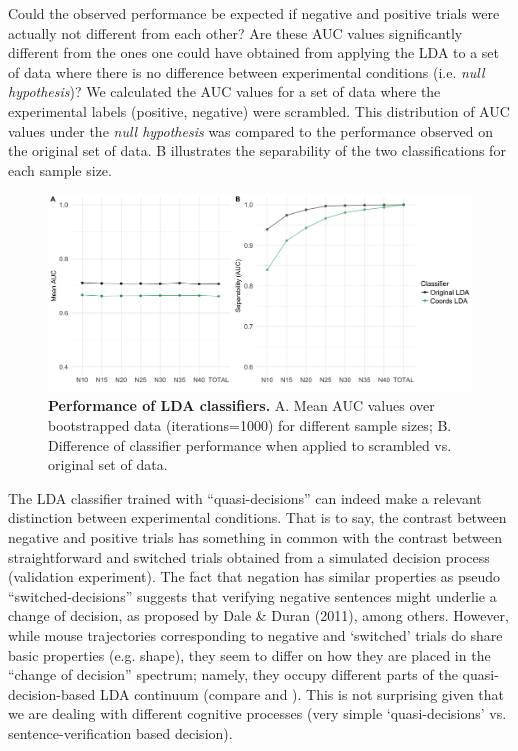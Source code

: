 \documentclass{article}
\begin{document}
Could the observed performance be expected if negative and positive trials were actually not different from each other? Are these AUC values significantly different from the ones one could have obtained from applying the LDA to a set of data where there is no difference between experimental conditions (i.e. \emph{null hypothesis})? We calculated the AUC values for a set of data where the experimental labels (positive, negative) were scrambled. This distribution of AUC values under the \emph{null hypothesis} was compared to the performance observed on the original set of data. B illustrates the separability of the two classifications for each sample size.

\begin{figure}
\centering
\includegraphics[width=\textwidth]{auc_permutation_negation_1.png}
\caption{\textbf{Performance of LDA classifiers.} A. Mean AUC values over bootstrapped data (iterations=1000) for different sample sizes;  B. Difference of classifier performance when applied to scrambled vs. original set of data.}
\label{fig:permutation_AUC_negation}
\end{figure}


The LDA classifier trained with ``quasi-decisions'' can indeed make a relevant distinction between experimental conditions. That is to say, the contrast between negative and positive trials has something in common with the contrast between straightforward and switched trials obtained from  a simulated decision process (validation experiment). The fact that negation has similar properties as pseudo “switched-decisions'' suggests that verifying negative sentences might underlie a change of decision, as proposed by Dale \& Duran (2011), among others.  
However, while mouse trajectories corresponding to negative and `switched' trials do share basic properties (e.g. shape), they seem to differ on how they are placed in the “change of decision” spectrum; namely, they occupy different parts of the quasi-decision-based LDA continuum (compare  and ). This is not surprising given that we are dealing with different cognitive processes (very simple `quasi-decisions' vs. sentence-verification based decision). 
\end{document}
